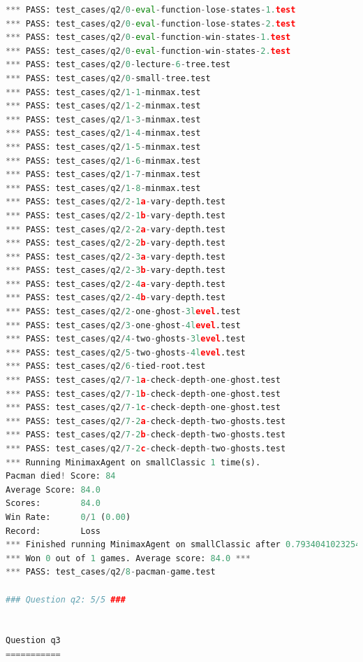 \documentclass{report}
\begin{document}
\begin{lstlisting}[language=Python, caption=Resultados del Autograder]
*** PASS: test_cases/q2/0-eval-function-lose-states-1.test
*** PASS: test_cases/q2/0-eval-function-lose-states-2.test
*** PASS: test_cases/q2/0-eval-function-win-states-1.test
*** PASS: test_cases/q2/0-eval-function-win-states-2.test
*** PASS: test_cases/q2/0-lecture-6-tree.test
*** PASS: test_cases/q2/0-small-tree.test
*** PASS: test_cases/q2/1-1-minmax.test
*** PASS: test_cases/q2/1-2-minmax.test
*** PASS: test_cases/q2/1-3-minmax.test
*** PASS: test_cases/q2/1-4-minmax.test
*** PASS: test_cases/q2/1-5-minmax.test
*** PASS: test_cases/q2/1-6-minmax.test
*** PASS: test_cases/q2/1-7-minmax.test
*** PASS: test_cases/q2/1-8-minmax.test
*** PASS: test_cases/q2/2-1a-vary-depth.test
*** PASS: test_cases/q2/2-1b-vary-depth.test
*** PASS: test_cases/q2/2-2a-vary-depth.test
*** PASS: test_cases/q2/2-2b-vary-depth.test
*** PASS: test_cases/q2/2-3a-vary-depth.test
*** PASS: test_cases/q2/2-3b-vary-depth.test
*** PASS: test_cases/q2/2-4a-vary-depth.test
*** PASS: test_cases/q2/2-4b-vary-depth.test
*** PASS: test_cases/q2/2-one-ghost-3level.test
*** PASS: test_cases/q2/3-one-ghost-4level.test
*** PASS: test_cases/q2/4-two-ghosts-3level.test
*** PASS: test_cases/q2/5-two-ghosts-4level.test
*** PASS: test_cases/q2/6-tied-root.test
*** PASS: test_cases/q2/7-1a-check-depth-one-ghost.test
*** PASS: test_cases/q2/7-1b-check-depth-one-ghost.test
*** PASS: test_cases/q2/7-1c-check-depth-one-ghost.test
*** PASS: test_cases/q2/7-2a-check-depth-two-ghosts.test
*** PASS: test_cases/q2/7-2b-check-depth-two-ghosts.test
*** PASS: test_cases/q2/7-2c-check-depth-two-ghosts.test
*** Running MinimaxAgent on smallClassic 1 time(s).
Pacman died! Score: 84
Average Score: 84.0
Scores:        84.0
Win Rate:      0/1 (0.00)
Record:        Loss
*** Finished running MinimaxAgent on smallClassic after 0.7934041023254395 seconds.
*** Won 0 out of 1 games. Average score: 84.0 ***
*** PASS: test_cases/q2/8-pacman-game.test

### Question q2: 5/5 ###


Question q3
===========


\end{lstlisting}
\end{document}
